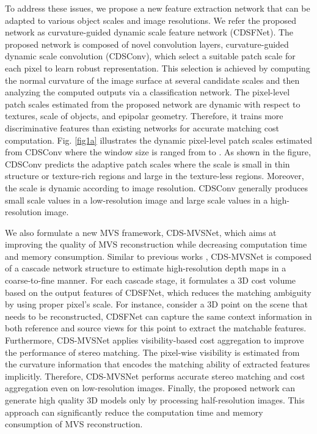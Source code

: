 \documentclass{article} \usepackage{iclr2022_conference,times}
\begin{document}
To address these issues, we propose a new feature extraction network that can be adapted to various object scales and image resolutions. We refer the proposed network as curvature-guided dynamic scale feature network (CDSFNet). The proposed network is composed of novel convolution layers, curvature-guided dynamic scale convolution (CDSConv), which select a suitable patch scale for each pixel to learn robust representation. This selection is achieved by computing the normal curvature of the image surface at several candidate scales and then analyzing the computed outputs via a classification network. The pixel-level patch scales estimated from the proposed network are dynamic with respect to textures, scale of objects, and epipolar geometry. Therefore, it trains more discriminative features than existing networks \citep{gu2020cascade,cheng2020deep,yang2020cost,zhang2020visibility,luo2020attention} for accurate matching cost computation. Fig. \ref{fig1a} illustrates the dynamic pixel-level patch scales estimated from CDSConv where the window size is ranged from  to . As shown in the figure, CDSConv predicts the adaptive patch scales where the scale is small in thin structure or texture-rich regions and large in the texture-less regions. Moreover, the scale is dynamic according to image resolution. CDSConv generally produces small scale values in a low-resolution image and large scale values in a high-resolution image.

We also formulate a new MVS framework, CDS-MVSNet, which aims at improving the quality of MVS reconstruction while decreasing computation time and memory consumption. Similar to previous works \citep{gu2020cascade,cheng2020deep,yang2020cost,wang2021patchmatchnet}, CDS-MVSNet is composed of a cascade network structure to estimate high-resolution depth maps in a coarse-to-fine manner. For each cascade stage, it formulates a 3D cost volume based on the output features of CDSFNet, which reduces the matching ambiguity by using proper pixel’s scale. For instance, consider a 3D point on the scene that needs to be reconstructed, CDSFNet can capture the same context information in both reference and source views for this point to extract the matchable features. Furthermore, CDS-MVSNet applies visibility-based cost aggregation to improve the performance of stereo matching. The pixel-wise visibility is estimated from the curvature information that encodes the matching ability of extracted features implicitly. Therefore, CDS-MVSNet performs accurate stereo matching and cost aggregation even on low-resolution images. Finally, the proposed network can generate high quality 3D models only by processing half-resolution images. This approach can significantly reduce the computation time and memory consumption of MVS reconstruction. 
\end{document}
